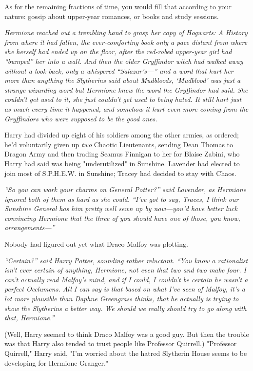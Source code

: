 As for the remaining fractions of time, you would fill that according to your
nature: gossip about upper-year romances, or books and study sessions.

\emph{Hermione reached out a trembling hand to grasp her copy of \emph{Hogwarts: A
History} from where it had fallen, the ever-comforting book only a pace
distant from where she herself had ended up on the floor, after the red-robed
upper-year girl had ``bumped'' her into a wall. And then the older Gryffindor
witch had walked away without a look back, only a whispered \mbox{``Salazar's---''} and
a word that hurt her more than anything the Slytherins said about Mudbloods,
`Mudblood' was just a strange wizarding word but Hermione knew the word the
Gryffindor had said. She couldn't get used to it, she just couldn't get used to
being hated. It still hurt just as much every time it happened, and somehow it
hurt even more coming from the Gryffindors who were \emph{supposed} to be the
good ones.}

Harry had divided up eight of his soldiers among the other armies, as ordered;
he'd voluntarily given up \emph{two} Chaotic Lieutenants, sending Dean Thomas
to Dragon Army and then trading Seamus Finnigan to her for Blaise Zabini, who
Harry had said was being "underutilized" in Sunshine. Lavender had elected to
join most of S.P.H.E.W. in Sunshine; Tracey had decided to stay with Chaos.

\emph{``So you can work your charms on General Potter?'' said Lavender, as
Hermione ignored both of them as hard as she could. ``I've got to say, Traces, I
think our Sunshine General has him pretty well sewn up by now---you'd have
better luck convincing Hermione that the three of you should have one of those,
you know, arrangements---''}

Nobody had figured out yet what Draco Malfoy was plotting.

\emph{``Certain?'' said Harry Potter, sounding rather reluctant. ``You know a
rationalist isn't ever certain of anything, Hermione, not even that two and two
make four. I can't actually read Malfoy's mind, and if I could, I couldn't be
certain he wasn't a perfect Occlumens. All I can say is that based on what I've
seen of Malfoy, it's a lot more plausible than Daphne Greengrass thinks, that
he actually is trying to show the Slytherins a better way. We should{\el} we
really should try to go along with that, Hermione.''}

(Well, Harry seemed to think Draco Malfoy was a good guy. But then the trouble
was that Harry also tended to trust people like Professor Quirrell.)
\sbreak
"Professor Quirrell," Harry said, "I'm worried about the hatred Slytherin House
seems to be developing for Hermione Granger."

